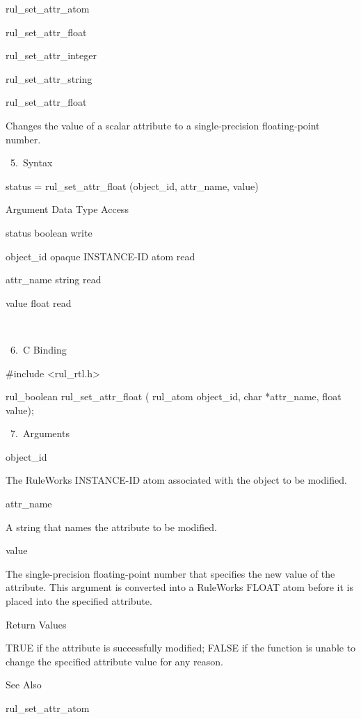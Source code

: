 {          rul_set_attr_atom

          rul_set_attr_float

          rul_set_attr_integer

          rul_set_attr_string

          rul_set_attr_float

          Changes the value of a scalar
          attribute to a single-precision
          floating-point number.

       5. Syntax

          status = rul_set_attr_float
          (object_id, attr_name, value)

          Argument  Data Type     Access

          status  boolean     write

          object_id  opaque INSTANCE-ID atom
           read

          attr_name  string     read

          value  float     read

           

       6. C Binding

          #include <rul_rtl.h>

          rul_boolean rul_set_attr_float (
          rul_atom object_id,
          char *attr_name,
          float value);

       7. Arguments

          object_id

          The RuleWorks INSTANCE-ID atom
          associated with the object to be
          modified.

          attr_name

          A string that names the attribute to
          be modified.

          value

          The single-precision floating-point
          number that specifies the new value
          of the attribute. This argument is
          converted into a RuleWorks FLOAT
          atom before it is placed into the
          specified attribute.

          Return Values

          TRUE if the attribute is
          successfully modified; FALSE if the
          function is unable to change the
          specified attribute value for any
          reason.

          See Also

          rul_set_attr_atom

}
